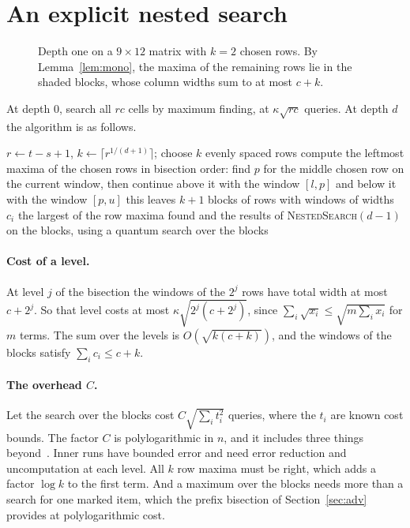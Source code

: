 \documentclass[11pt]{article}
\theoremstyle{definition}
\theoremstyle{remark}
\newcommand{\AlgNest}{\textsc{NestedSearch}}
\begin{document}
\section{An explicit nested search}\label{sec:nested}

\begin{figure}[ht]
\centering

\caption{Depth one on a $9\times 12$ matrix with $k=2$ chosen rows. By Lemma~\ref{lem:mono}, the maxima of the remaining rows lie in the shaded blocks, whose column widths sum to at most $c+k$.}
\label{fig:windows}
\end{figure}

At depth $0$, search all $rc$ cells by maximum finding, at $\kappa\sqrt{rc}$ queries. At depth $d$ the algorithm is as follows.

\begin{algorithm}[h]
\caption{\AlgNest$(d)$ on rows $s,\dots,t$ and columns $l,\dots,u$}
\begin{algorithmic}[1]
\State $r\gets t-s+1$, $k\gets\lceil r^{1/(d+1)}\rceil$; choose $k$ evenly spaced rows
\State compute the leftmost maxima of the chosen rows in bisection order: find $p$ for the middle chosen row on the current window, then continue above it with the window $[l,p]$ and below it with the window $[p,u]$
\State this leaves $k+1$ blocks of rows with windows of widths $c_i$
\State \Return the largest of the row maxima found and the results of \AlgNest$(d-1)$ on the blocks, using a quantum search over the blocks
\end{algorithmic}
\end{algorithm}

\paragraph{Cost of a level.} At level $j$ of the bisection the windows of the $2^j$ rows have total width at most $c+2^j$. So that level costs at most $\kappa\sqrt{2^j(c+2^j)}$, since $\sum_i\sqrt{x_i}\le\sqrt{m\sum_i x_i}$ for $m$ terms. The sum over the levels is $O(\sqrt{k(c+k)})$, and the windows of the blocks satisfy $\sum_i c_i\le c+k$.

\paragraph{The overhead $C$.} Let the search over the blocks cost $C\sqrt{\sum_i t_i^2}$ queries, where the $t_i$ are known cost bounds. The factor $C$ is polylogarithmic in $n$, and it includes three things beyond~\cite{Amb06,Amb10}. Inner runs have bounded error and need error reduction and uncomputation at each level. All $k$ row maxima must be right, which adds a factor $\log k$ to the first term. And a maximum over the blocks needs more than a search for one marked item, which the prefix bisection of Section~\ref{sec:adv} provides at polylogarithmic cost.
\end{document}
